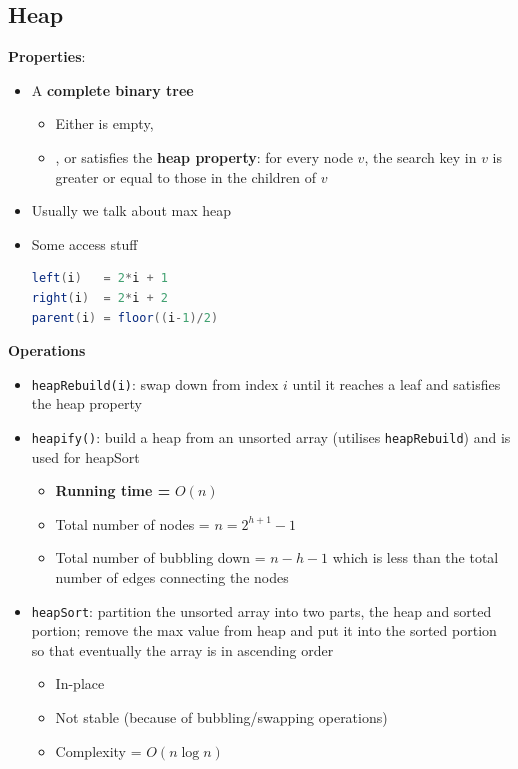 \documentclass{article}
\begin{document}
\begin{multicols}{2}
\subsection{Heap}
\textbf{Properties}:
\begin{itemize}
	\item A \textbf{complete binary tree}
	\begin{itemize}
		\item Either is empty,
		\item, or satisfies the \textbf{heap property}: for every node $v$, the search key in $v$ is greater or equal to those in the children of $v$
	\end{itemize}
    \item Usually we talk about max heap
    \item Some access stuff
    \begin{lstlisting}[language=Java]
left(i)   = 2*i + 1
right(i)  = 2*i + 2
parent(i) = floor((i-1)/2)\end{lstlisting}
\end{itemize}
\textbf{Operations}
\begin{itemize}
	\item \texttt{heapRebuild(i)}: swap down from index $i$ until it reaches a leaf and satisfies the heap property
	\item \texttt{heapify()}: build a heap from an unsorted array (utilises \texttt{heapRebuild}) and is used for heapSort
	\begin{itemize}
		\item \textbf{Running time = }$O(n)$
		\item Total number of nodes = $n = 2^{h+1} - 1$
		\item Total number of bubbling down = $n-h-1$ which is less than the total number of edges connecting the nodes
	\end{itemize}
	\item \texttt{heapSort}: partition the unsorted array into two parts, the heap and sorted portion; remove the max value from heap and put it into the sorted portion so that eventually the array is in ascending order
	\begin{itemize}
		\item In-place
		\item Not stable (because of bubbling/swapping operations)
		\item Complexity = $O(n\log n)$
	\end{itemize}
\end{itemize}


\end{multicols}
\end{document}
